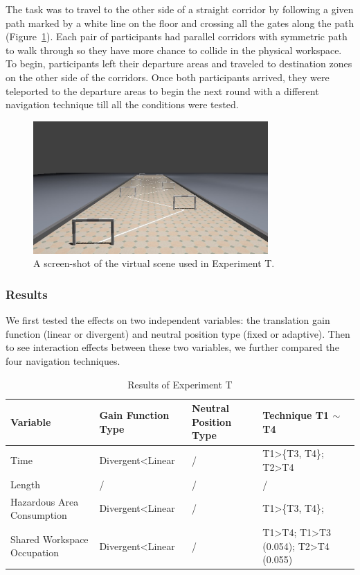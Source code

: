 The task was to travel to the other side of a straight corridor by following a given path marked by a white line on the floor and crossing all the gates along the path (Figure~\ref{fig:4_task1}). Each pair of participants had parallel corridors with symmetric path to walk through so they have more chance to collide in the physical workspace. To begin, participants left their departure areas and traveled to destination zones on the other side of the corridors. Once both participants arrived, they were teleported to the departure areas to begin the next round with a different navigation technique till all the conditions were tested.

\begin{figure}[tb]
  \centering
  \includegraphics[width=0.8\textwidth]{figures/ch4/t1}
  \caption{\label{fig:4_task1}A screen-shot of the virtual scene used in Experiment T.}
\end{figure}

\subsubsection{Results}
We first tested the effects on two independent variables: the translation gain function (linear or divergent) and neutral position type (fixed or adaptive). Then to see interaction effects between these two variables, we further compared the four navigation techniques.

\begin{table}[!t]
\renewcommand{\arraystretch}{1.3}
\caption{Results of Experiment T}
\label{tab:4_result_t1}
\centering
\begin{tabular}{l l l l}
  \hline
  Variable & Gain Function Type & Neutral Position Type & Technique T1 $\sim$ T4 \\
  \hline
  Time & Divergent\textless Linear & / & T1\textgreater \{T3, T4\}; T2\textgreater T4 \\
  Length & / & / & / \\
  Hazardous Area Consumption & Divergent\textless Linear & / & T1\textgreater \{T3, T4\}; \\
  Shared Workspace Occupation & Divergent\textless Linear & / & T1\textgreater T4; T1\textgreater T3 (0.054); T2\textgreater T4 (0.055) \\
  \hline
\end{tabular}
\end{table}

